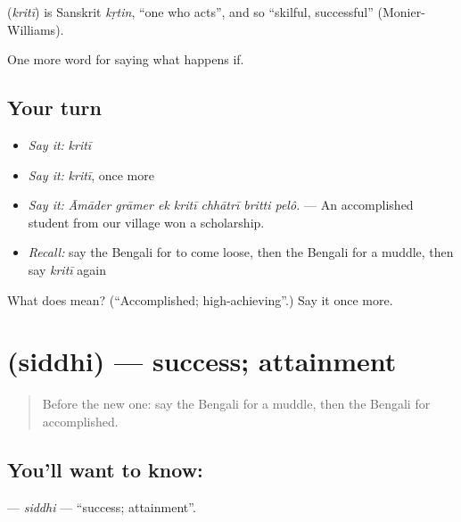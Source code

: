 \begin{cousinweb}
\textbf{} (\emph{kritī}) is Sanskrit \emph{kṛtin}, \textquotedblleft{}one who acts\textquotedblright{}, and so \textquotedblleft{}skilful, successful\textquotedblright{} (Monier-Williams).
\end{cousinweb}

\begin{grammarlens}[title={What you've built}]
One more word for saying what happens if.
\end{grammarlens}

\subsection*{Your turn}
\begin{itemize}
\raggedright
  \item \emph{Say it:} \emph{kritī}
  \item \emph{Say it:} \emph{kritī}, once more
  \item \emph{Say it:} \emph{Āmāder grāmer ek kritī chhātrī britti pelô.} — An accomplished student from our village won a scholarship.
  \item \emph{Recall:} say the Bengali for to come loose, then the Bengali for a muddle, then say \emph{kritī} again
\end{itemize}

\begin{tcolorbox}[breakable,colback=teal!4,colframe=teal!35!black,title={Before you move on}]
What does  mean? (\textquotedblleft{}Accomplished; high-achieving\textquotedblright{}.) Say it once more.
\end{tcolorbox}
\section[\texorpdfstring{\bn{সিদ্ধি} (siddhi)}{সিদ্ধি (siddhi)}]{ (siddhi) — success; attainment}

\label{lesson:BN-C543-siddhi}



\begin{quote}
Before the new one: say the Bengali for a muddle, then the Bengali for accomplished.
\end{quote}

\subsection*{You'll want to know: }
\textbf{} — \emph{siddhi} — \textquotedblleft{}success; attainment\textquotedblright{}.

